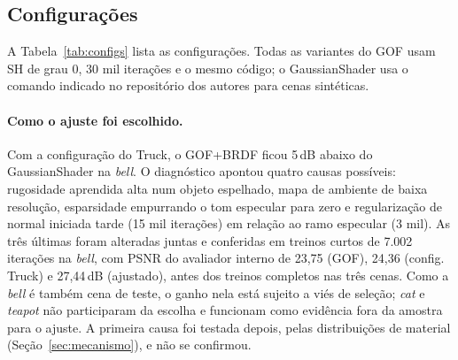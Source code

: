 \documentclass[12pt]{article}
\newcommand{\dB}{\,dB}
\begin{document}
\subsection{Configurações}
A Tabela~\ref{tab:configs} lista as configurações.
Todas as variantes do GOF usam SH de grau 0, 30 mil iterações e o mesmo código; o GaussianShader usa o comando indicado no repositório dos autores para cenas sintéticas.

\begin{table}[t]
\centering
\caption{\textbf{Configurações avaliadas.} Hiperparâmetros não listados seguem os valores-padrão do GOF. O GaussianShader usa \texttt{-{}-brdf\_dim 0 -{}-sh\_degree -1 -{}-lambda\_predicted\_normal 2e-1 -{}-brdf\_env 512}, como no repositório dos autores, com iluminação em \emph{cubemap} e regras próprias para normal e ativação dos termos.}
\label{tab:configs}
\footnotesize
\linespread{1.0}\selectfont
{}
\end{table}

\paragraph{Como o ajuste foi escolhido.}
Com a configuração do Truck, o GOF+BRDF ficou 5\dB{} abaixo do GaussianShader na \emph{bell}.
O diagnóstico apontou quatro causas possíveis: rugosidade aprendida alta num objeto espelhado, mapa de ambiente de baixa resolução, esparsidade empurrando o tom especular para zero e regularização de normal iniciada tarde (15 mil iterações) em relação ao ramo especular (3 mil).
As três últimas foram alteradas juntas e conferidas em treinos curtos de 7.002 iterações na \emph{bell}, com PSNR do avaliador interno de 23,75 (GOF), 24,36 (config. Truck) e 27,44\dB{} (ajustado), antes dos treinos completos nas três cenas.
Como a \emph{bell} é também cena de teste, o ganho nela está sujeito a viés de seleção; \emph{cat} e \emph{teapot} não participaram da escolha e funcionam como evidência fora da amostra para o ajuste.
A primeira causa foi testada depois, pelas distribuições de material (Seção~\ref{sec:mecanismo}), e não se confirmou.
\end{document}
